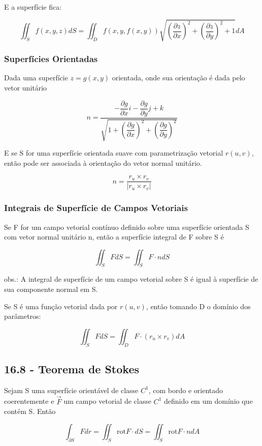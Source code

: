 \documentclass[12pt]{article}
\begin{document}
E a superfície fica:

$$\iint_S f(x, y, z) dS = \iint_D f(x, y, f(x, y)) \sqrt{\left(\frac{\partial z}{\partial x}\right)^2 + \left(\frac{\partial z}{\partial y}\right)^2 + 1} dA$$

\subsubsection*{Superfícies Orientadas}
Dada uma superfície $z = g(x, y)$ orientada, onde sua orientação é dada pelo vetor unitário

$$n = \dfrac{-\dfrac{\partial g}{\partial x}i - \dfrac{\partial g}{\partial y}j + k}{\sqrt{1 + \left(\dfrac{\partial g}{\partial x}\right)^2 + \left(\dfrac{\partial g}{\partial y}\right)^2}}$$

E se S for uma superfície orientada suave com parametrização vetorial $r(u, v)$, então pode ser associada à orientação do vetor normal unitário.

$$n = \dfrac{r_u \times r_v}{|r_u \times r_v|}$$

\subsubsection*{Integrais de Superfície de Campos Vetoriais}

Se F for um campo vetorial contínuo definido sobre uma superfície orientada S com vetor normal unitário n, então a superfície integral de F sobre S é

$$\iint_S F d S = \iint_S F \cdot n d S$$

obs.: A integral de superfície de um campo vetorial sobre S é igual à superfície de sua componente normal em S.

Se S é uma função vetorial dada por $r(u, v)$, então tomando D o domínio dos parâmetros:

$$\iint_S F dS = \iint_D F \cdot (r_u \times r_v) d A$$

\subsection*{16.8 - Teorema de Stokes}
\label{s9}

Sejam S uma superfície orientável de classe $C^1$, com bordo e orientado coerentemente e $\Vec{F}$ um campo vetorial de classe $C^1$ definido em um domínio que contém S. Então

$$\int_{\partial S} F d r = \iint_S \text{rot} F \cdot d S =  \iint_S \text{rot} F \cdot n d A$$
\end{document}
